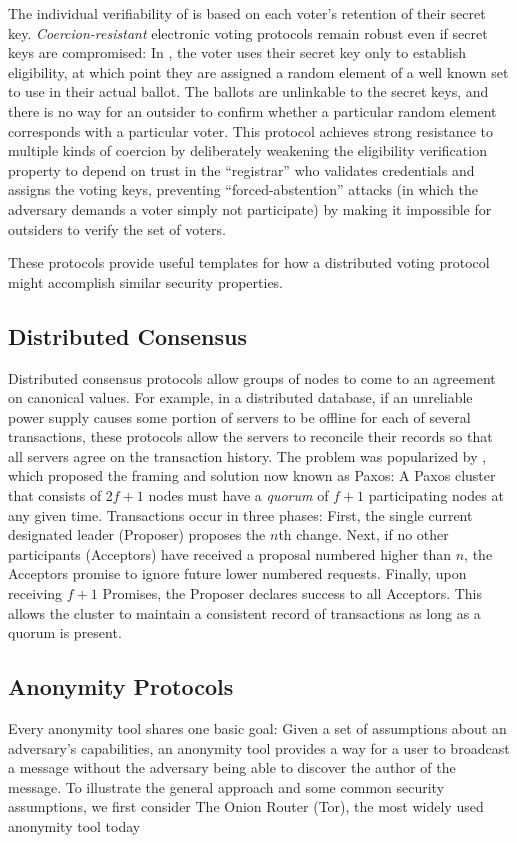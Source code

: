   The individual verifiability of \cite{neff} is based on each
  voter's retention of their secret key. \emph{Coercion-resistant} electronic
  voting protocols remain robust even if secret keys are compromised: In
  \cite{juels_coercion-resistant_2005}, the voter uses their secret key only
  to establish eligibility, at which point they are assigned a random element
  of a well known set to use in their actual ballot. The ballots are
  unlinkable to the secret keys, and there is no way for an outsider to
  confirm whether a particular random element corresponds with a particular
  voter. This protocol achieves strong resistance to multiple kinds of
  coercion by deliberately weakening the eligibility verification property to
  depend on trust in the ``registrar'' who validates credentials and assigns
  the voting keys, preventing ``forced-abstention'' attacks (in which the
  adversary demands a voter simply not participate) by making it impossible
  for outsiders to verify the set of voters.

  These protocols provide useful templates for how a distributed voting
  protocol might accomplish similar security properties.

  \subsection{Distributed Consensus}
    Distributed consensus protocols allow groups of nodes to come to an
    agreement on canonical values. For example, in a distributed database, if an
    unreliable power supply causes some portion of servers to be offline for
    each of several transactions, these protocols allow the
    servers to reconcile their records so that all servers agree on the
    transaction history. The problem was popularized by
    \cite{paxos}, which proposed the framing and solution now
    known as Paxos: A Paxos cluster that consists of 2$f+1$ nodes must have a
    \emph{quorum} of $f + 1$ participating nodes at any given time.
    Transactions occur in three phases: First, the single current designated
    leader (Proposer) proposes the $n$th change. Next, if no other participants
    (Acceptors) have received a proposal numbered higher than $n$, the Acceptors
    promise to ignore future lower numbered requests.  Finally, upon receiving
    $f+1$ Promises, the Proposer declares success to all Acceptors. This allows
    the cluster to maintain a consistent record of transactions as long as a
    quorum is present.


\subsection{Anonymity Protocols}
\label{subsection:ExistingAnonymity}
  Every anonymity tool shares one basic goal: Given a set of assumptions about
  an adversary's capabilities, an anonymity tool provides a way for a user to
  broadcast a message without the adversary being able to discover the author
  of the message.  To illustrate the general approach and some common
  security assumptions, we first consider The Onion Router (Tor), the most
  widely used anonymity tool today\cite{ford_hiding_2014}

